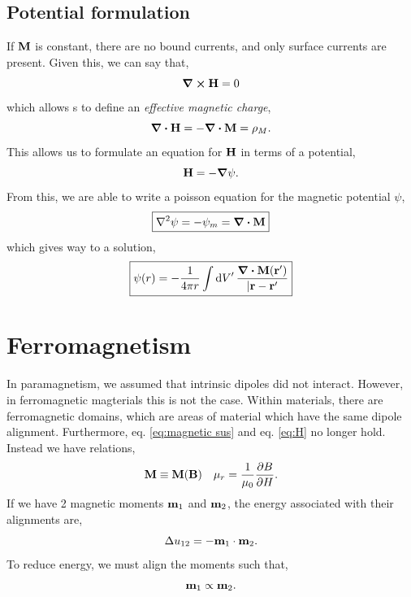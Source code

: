 \documentclass{book}
\begin{document}
\subsection{Potential formulation}
If $\vb{M}$ is constant, there are no bound currents, and only surface currents are present. Given this, we can say that,
\begin{equation}
	\curl{\vb{H}} = 0
\end{equation}
which allows s to define an \textit{effective magnetic charge},
\begin{equation}
	\div{\vb{H}} = - \div{\vb{M}} = \rho_{M}.
\end{equation}
This allows us to formulate an equation for $\vb{H}$ in terms of a potential,
\begin{equation}
	\vb{H} = - \grad \psi.
\end{equation}
From this, we are able to write a poisson equation for the magnetic potential $\psi$,
\begin{equation}
	\boxed{\laplacian\psi = -\psi_m = \div{\vb{M}}} 
\end{equation}
which gives way to a solution,
\begin{equation}
	\boxed{\psi(r) = - \frac{1}{4\pi r}\int \dd{V}' \frac{\div{\vb{M}(\vb{r}')}}{|\vb{r} - \vb{r}'}}
\end{equation}

\section{Ferromagnetism}
In paramagnetism, we assumed that intrinsic dipoles did not interact. However, in ferromagnetic magterials this is not the case. Within materials, there are ferromagnetic domains, which are areas of material which have the same dipole alignment. Furthermore, eq. \eqref{eq:magnetic sus} and eq. \eqref{eq:H} no longer hold. Instead we have relations,
\begin{align}
	\vb{M} \equiv \vb{M}(\vb{B}) && \mu_r = \frac{1}{\mu_0}\pdv{B}{H}.
\end{align} 
If we have 2 magnetic moments $\vb{m}_1$ and $\vb{m}_2$, the energy associated with their alignments are,
\begin{equation}
	\Delta u_{12} = - \vb{m}_1\cdot \vb{m}_2.
\end{equation}
To reduce energy, we must align the moments such that,
\begin{equation}
	\vb{m}_1 \propto \vb{m}_2.
\end{equation}
\end{document}
